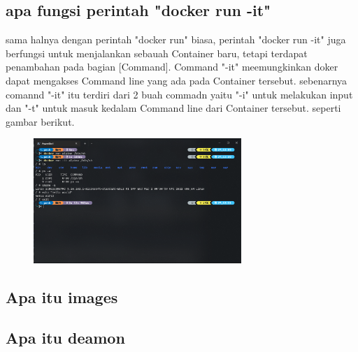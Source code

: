 \documentclass[11pt,a4paper]{article}
\begin{document}
\subsection*{apa fungsi perintah "docker run -it"}
sama halnya dengan perintah "docker run" biasa, perintah "docker run -it" juga berfungsi untuk menjalankan
sebauah Container baru, tetapi terdapat penambahan pada bagian [Command]. Command "-it" meemungkinkan
doker dapat mengakses Command line yang ada pada Container tersebut. sebenarnya comannd "-it" itu terdiri 
dari 2 buah commadn yaitu "-i" untuk melakukan input dan "-t" untuk masuk kedalam Command line dari Container tersebut.
seperti gambar berikut.
\begin{figure}[h]
	\centering
	\includegraphics[width = 0.7\textwidth]{Figure/asset/docker_bin_sh.png}
\end{figure}


\subsection*{Apa itu images}

\subsection*{Apa itu deamon}
\end{document}
